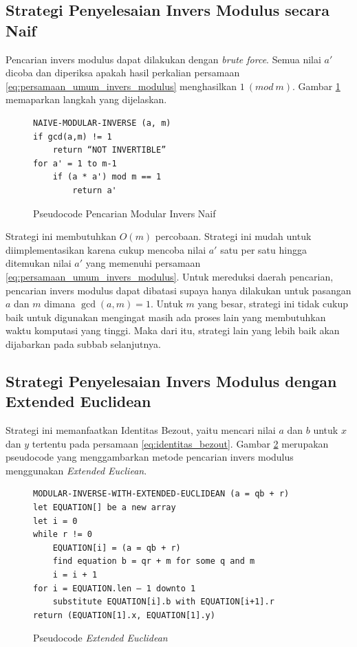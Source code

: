 \subsection{Strategi Penyelesaian Invers Modulus secara Naif}

Pencarian invers modulus dapat dilakukan dengan \textit{brute force}. Semua nilai $ a' $ dicoba dan diperiksa apakah hasil perkalian persamaan \eqref{eq:persamaan_umum_invers_modulus} menghasilkan $ 1\ (mod\ m) $. Gambar \ref{psdo:modinv_naive} memaparkan langkah yang dijelaskan.
\begin{figure}[h!]
\begin{lstlisting}[firstnumber=0]
NAIVE-MODULAR-INVERSE (a, m)
if gcd(a,m) != 1
	return “NOT INVERTIBLE”
for a' = 1 to m-1
	if (a * a') mod m == 1
		return a'
\end{lstlisting}
\caption{Pseudocode Pencarian Modular Invers Naif}
\label{psdo:modinv_naive}
\end{figure}

Strategi ini membutuhkan $ O(m) $ percobaan. Strategi ini mudah untuk diimplementasikan karena cukup mencoba nilai $ a' $ satu per satu hingga ditemukan nilai $ a' $ yang memenuhi persamaan \eqref{eq:persamaan_umum_invers_modulus}. Untuk mereduksi daerah pencarian, pencarian invers modulus dapat dibatasi supaya hanya dilakukan untuk pasangan $ a $ dan $ m $ dimana $ \gcd⁡(a, m)= 1 $. Untuk $ m $ yang besar, strategi ini tidak cukup baik untuk digunakan mengingat masih ada proses lain yang membutuhkan waktu komputasi yang tinggi. Maka dari itu, strategi lain yang lebih baik akan dijabarkan pada subbab selanjutnya.

\subsection {Strategi Penyelesaian Invers Modulus dengan Extended Euclidean}

Strategi ini memanfaatkan Identitas Bezout, yaitu mencari nilai $ a $ dan $ b $ untuk $ x $ dan $ y $ tertentu pada persamaan \eqref{eq:identitas_bezout}. Gambar \ref{psdo:extended_euclidean} merupakan pseudocode yang menggambarkan metode pencarian invers modulus menggunakan \textit{Extended Eucliean}.

\begin{figure}[h!]
\begin{lstlisting}[firstnumber=0]
MODULAR-INVERSE-WITH-EXTENDED-EUCLIDEAN (a = qb + r)
let EQUATION[] be a new array
let i = 0
while r != 0
	EQUATION[i] = (a = qb + r)
	find equation b = qr + m for some q and m
	i = i + 1
for i = EQUATION.len – 1 downto 1
	substitute EQUATION[i].b with EQUATION[i+1].r
return (EQUATION[1].x, EQUATION[1].y)
\end{lstlisting}
\caption{Pseudocode \textit{Extended Euclidean}}
\label{psdo:extended_euclidean}
\end{figure}


